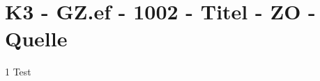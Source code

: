 \section{K3 - GZ.ef - 1002 - Titel - ZO - Quelle}

\begin{langesbeispiel} \item[1] %
Test
\end{langesbeispiel}